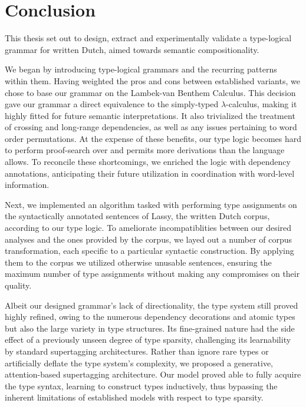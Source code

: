 \chapter{Conclusion}
\label{chapter:conclusion}
This thesis set out to design, extract and experimentally validate a type-logical grammar for written Dutch, aimed towards semantic compositionality.

We began by introducing type-logical grammars and the recurring patterns within them.
Having weighted the pros and cons between established variants, we chose to base our grammar on the Lambek-van Benthem Calculus.
This decision gave our grammar a direct equivalence to the simply-typed $\lambda$-calculus, making it highly fitted for future semantic interpretations.
It also trivialized the treatment of crossing and long-range dependencies, as well as any issues pertaining to word order permutations.
At the expense of these benefits, our type logic becomes hard to perform proof-search over and permits more derivations than the language allows.
To reconcile these shortcomings, we enriched the logic with dependency annotations, anticipating their future utilization in coordination with word-level information.

Next, we implemented an algorithm tasked with performing type assignments on the syntactically annotated sentences of Lassy, the written Dutch corpus, according to our type logic.
To ameliorate incompatiblities between our desired analyses and the ones provided by the corpus, we layed out a number of corpus transformation, each specific to a particular syntactic construction.
By applying them to the corpus we utilized otherwise unusable sentences, ensuring the maximum number of type assignments without making any compromises on their quality.

Albeit our designed grammar's lack of directionality, the type system still proved highly refined, owing to the numerous dependency decorations and atomic types but also the large variety in type structures.
Its fine-grained nature had the side effect of a previously unseen degree of type sparsity, challenging its learnability by standard supertagging architectures.
Rather than ignore rare types or artificially deflate the type system's complexity, we proposed a generative, attention-based supertagging architecture.
Our model proved able to fully acquire the type syntax, learning to construct types inductively, thus bypassing the inherent limitations of established models with respect to type sparsity.

